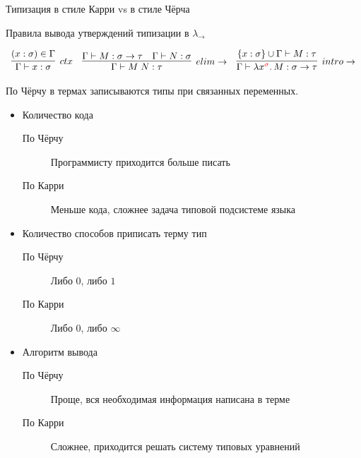     \begin{frame}{Типизация в стиле Карри vs {\color{red} в стиле Чёрча}}
        \begin{block}{Правила вывода утверждений типизации в $\lambda_{\rightarrow}$}
            \vspace{-1em}
            \begin{center}
                \[
                    \begin{array}{l c r}
                        \infer[ctx]{\Gamma \vdash x: \sigma}{(x: \sigma) \in \Gamma}
                        &
                        \infer[elim\to]{\Gamma \vdash M\;N : \tau}{\Gamma \vdash M : \sigma \to \tau & \Gamma \vdash N : \sigma}
                        &
                        \infer[intro\to]{\Gamma \vdash \lambda x^{\color{red} \sigma}\ldotp M : \sigma \to \tau}{\{x : \sigma\} \cup \Gamma \vdash M : \tau}
                    \end{array}
                \]
            \end{center}
        \end{block}
        \vspace{1em}
        \pause
        По Чёрчу в термах записываются типы при связанных переменных.
        \begin{itemize}
            \item Количество кода
            \begin{description}
                \item[По Чёрчу] Программисту приходится больше писать
                \item[По Карри] Меньше кода, сложнее задача типовой подсистеме языка
            \end{description}
            \item Количество способов приписать терму тип
            \begin{description}
                \item[По Чёрчу] Либо $0$, либо $1$
                \item[По Карри] Либо $0$, либо $\infty$
            \end{description}
            \item \pause Алгоритм вывода
            \begin{description}
                \item[По Чёрчу] Проще, вся необходимая информация написана в терме
                \item[По Карри] Сложнее, приходится решать систему типовых уравнений
            \end{description}
        \end{itemize}
    \end{frame}


